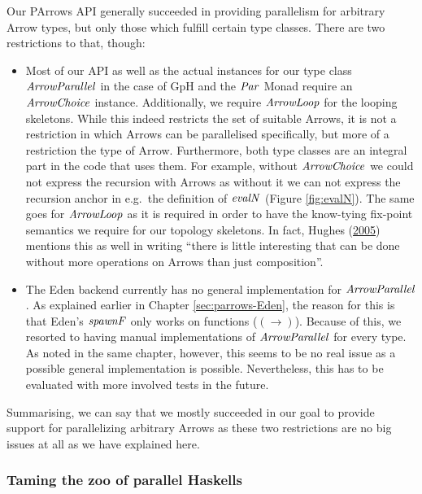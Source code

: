 \documentclass[paper=A4,twoside=true,openright,parskip=full,chapterprefix=true,headings=normal,bibliography=totoc,listof=totoc,titlepage=on,captions=tableabove,draft=false,british]{scrreprt}%
\renewcommand{\enquote}[1]{{``}#1{''}}
\begin{document}
Our PArrows API generally succeeded in providing parallelism for
arbitrary Arrow types, but only those which fulfill certain type
classes. There are two restrictions to that, though:

\begin{itemize}
\item
  Most of our API as well as the actual instances for our type class
  \ensuremath{\Conid{ArrowParallel}} in the case of GpH and the \ensuremath{\Conid{Par}} Monad require an
  \ensuremath{\Conid{ArrowChoice}} instance. Additionally, we require \ensuremath{\Conid{ArrowLoop}} for the
  looping skeletons. While this indeed restricts the set of suitable
  Arrows, it is not a restriction in which Arrows can be parallelised
  specifically, but more of a restriction the type of Arrow.
  Furthermore, both type classes are an integral part in the code that
  uses them. For example, without \ensuremath{\Conid{ArrowChoice}} we could not express the
  recursion with Arrows as without it we can not express the recursion
  anchor in e.g.~the definition of \ensuremath{\Varid{evalN}} (Figure \ref{fig:evalN}). The
  same goes for \ensuremath{\Conid{ArrowLoop}} as it is required in order to have the
  know-tying fix-point semantics we require for our topology skeletons.
  In fact, Hughes (\protect\hyperlink{ref-Hughes2005}{2005}) mentions
  this as well in writing
  \enquote{there is little interesting that can be done without
  more operations on Arrows than just composition}.
\item
  The Eden backend currently has no general implementation for
  \ensuremath{\Conid{ArrowParallel}}. As explained earlier in Chapter
  \ref{sec:parrows-Eden}, the reason for this is that Eden's \ensuremath{\Varid{spawnF}}
  only works on functions (\ensuremath{(\to )}). Because of this, we resorted to
  having manual implementations of \ensuremath{\Conid{ArrowParallel}} for every type. As
  noted in the same chapter, however, this seems to be no real issue as
  a possible general implementation is possible. Nevertheless, this has
  to be evaluated with more involved tests in the future.
\end{itemize}

Summarising, we can say that we mostly succeeded in our goal to provide
support for parallelizing arbitrary Arrows as these two restrictions are
no big issues at all as we have explained here.

\hypertarget{taming-the-zoo-of-parallel-haskells}{%
\subsubsection{Taming the zoo of parallel
Haskells}\label{taming-the-zoo-of-parallel-haskells}}
\end{document}
